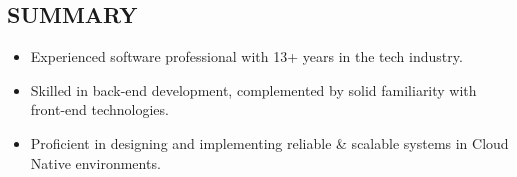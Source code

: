 \subsection*{SUMMARY}

\begin{itemize}[leftmargin=*,labelsep=1mm]
  \setlength{\parskip}{0mm}
  \setlength{\itemsep}{1mm}
  \item Experienced software professional with 13+ years in the tech industry.

  \item Skilled in back-end development, complemented by solid familiarity with front-end technologies.
  
  \item Proficient in designing and implementing reliable \& scalable systems in Cloud Native environments.
\end{itemize}
